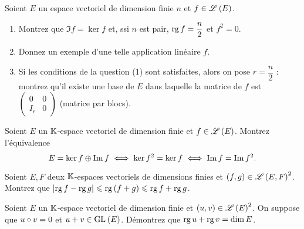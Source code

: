 \begin{corr}
\end{corr}

\begin{exopss}[Exercice 16]
Soient \(E\) un espace vectoriel de dimension finie \(n\) et \(f\in\mathscr{L}\left(E\right)\).

\begin{enumerate}
    \item Montrez que \(\Im f=\ker f\) et, ssi \(n\) est pair, \(\operatorname{rg} f=\dfrac{n}{2}\) et \(f^2=0\). \\
    \item Donnez un exemple d'une telle application linéaire \(f\). \\
    \item Si les conditions de la question (1)  sont satisfaites, alors on pose \(r=\dfrac{n}{2}\) : montrez qu'il existe une base de \(E\) dans laquelle la matrice de \(f\) est \(\begin{pmatrix}0 & 0 \\ I_r & 0\end{pmatrix}\) (matrice par blocs).
\end{enumerate}
\end{exopss}

\begin{corr}
\end{corr}

\begin{exopss}[Exercice 17]
Soient \(E\) un \(\mathbb{K}\)-espace vectoriel de dimension finie et \(f\in\mathscr{L}\left(E\right)\). Montrez l'équivalence \[E=\ker f\oplus\operatorname{Im} f\iff\ker f^2=\ker f\iff\operatorname{Im} f=\operatorname{Im} f^2.\]
\end{exopss}

\begin{corr}
\end{corr}

\begin{exos}[Exercice 18]
Soient \(E,F\) deux \(\mathbb{K}\)-espaces vectoriels de dimensions finies et \(\left(f,g\right)\in\mathscr{L}\left(E,F\right)^2\). Montrez que \(\left\lvert\operatorname{rg} f-\operatorname{rg} g\right\rvert\leqslant\operatorname{rg}\left(f+g\right)\leqslant\operatorname{rg} f+\operatorname{rg} g\).
\end{exos}

\begin{corr}
\end{corr}

\begin{exoss}[Exercice 19]
Soient \(E\) un \(\mathbb{K}\)-espace vectoriel de dimension finie et \(\left(u,v\right)\in\mathscr{L}\left(E\right)^2\). On suppose que \(u\circ v=0\) et \(u+v\in\GL{}[E]\). Démontrez que \(\operatorname{rg} u+\operatorname{rg} v=\dim E\).
\end{exoss}

